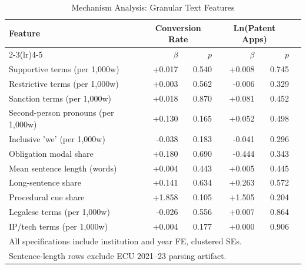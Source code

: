 \begin{table}[htbp]
\caption{Mechanism Analysis: Granular Text Features}
\label{tab:mechanism}
\small
\begin{tabular}{lrrrrr}
\toprule
Feature & \multicolumn{2}{c}{Conversion Rate} & \multicolumn{2}{c}{Ln(Patent Apps)} \\
\cmidrule(lr){2-3}\cmidrule(lr){4-5}
 & $\beta$ & $p$ & $\beta$ & $p$ \\
\midrule
  Supportive terms (per 1,000w) & +0.017 & 0.540 & +0.008 & 0.745 \\
  Restrictive terms (per 1,000w) & +0.003 & 0.562 & -0.006 & 0.329 \\
  Sanction terms (per 1,000w) & +0.018 & 0.870 & +0.081 & 0.452 \\
  Second-person pronouns (per 1,000w) & +0.130 & 0.165 & +0.052 & 0.498 \\
  Inclusive 'we' (per 1,000w) & -0.038 & 0.183 & -0.041 & 0.296 \\
  Obligation modal share & +0.180 & 0.690 & -0.444 & 0.343 \\
  Mean sentence length (words) & +0.004 & 0.443 & +0.005 & 0.445 \\
  Long-sentence share & +0.141 & 0.634 & +0.263 & 0.572 \\
  Procedural cue share & +1.858 & 0.105 & +1.505 & 0.204 \\
  Legalese terms (per 1,000w) & -0.026 & 0.556 & +0.007 & 0.864 \\
  IP/tech terms (per 1,000w) & +0.004 & 0.177 & +0.000 & 0.906 \\
\bottomrule
\multicolumn{5}{l}{\footnotesize All specifications include institution and year FE, clustered SEs.}\\
\multicolumn{5}{l}{\footnotesize Sentence-length rows exclude ECU 2021--23 parsing artifact.}\\
\end{tabular}
\end{table}